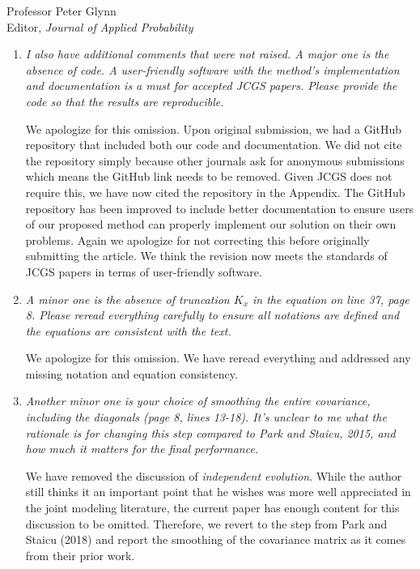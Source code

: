 \documentclass[11pt]{letter} %
\begin{document}
\begin{letter}{Professor
	Peter Glynn\\
	Editor, {\em Journal of Applied Probability}}
\begin{enumerate}
\item {\it I also have additional comments that were not raised. A major one is the absence of code. A user-friendly software with the method’s implementation and documentation is a must for accepted JCGS papers. Please provide the code so that the results are reproducible.}

\vspace{5mm}
We apologize for this omission.  Upon original submission, we had a GitHub repository that included both our code and documentation.  We did not cite the repository simply because other journals ask for anonymous submissions which means the GitHub link needs to be removed.  Given JCGS does not require this, we have now cited the repository in the Appendix.  The GitHub repository has been improved to include better documentation to ensure users of our proposed method can properly implement our solution on their own problems. Again we apologize for not correcting this before originally submitting the article. We think the revision now meets the standards of JCGS papers in terms of user-friendly software.
\vspace{5mm}

\item {\it
A minor one is the absence of truncation $K_x$ in the equation on line 37, page 8. Please reread everything carefully to ensure all notations are defined and the equations are consistent with the text.}

\vspace{5mm}
We apologize for this omission. We have reread everything and addressed any missing notation and equation consistency.
\vspace{5mm}

\item {\it Another minor one is your choice of smoothing the entire covariance, including the diagonals (page 8, lines 13-18). It’s unclear to me what the rationale is for changing this step compared to Park and Staicu, 2015, and how much it matters for the final performance.}

\vspace{5mm}
We have removed the discussion of \emph{independent evolution}.  While the author still thinks it an important point that he wishes was more well appreciated in the joint modeling literature, the current paper has enough content for this discussion to be omitted.  Therefore, we revert to the step from Park and Staicu (2018) and report the smoothing of the covariance matrix as it comes from their prior work.
\vspace{5mm}


\end{enumerate}
\end{letter}
\end{document}
